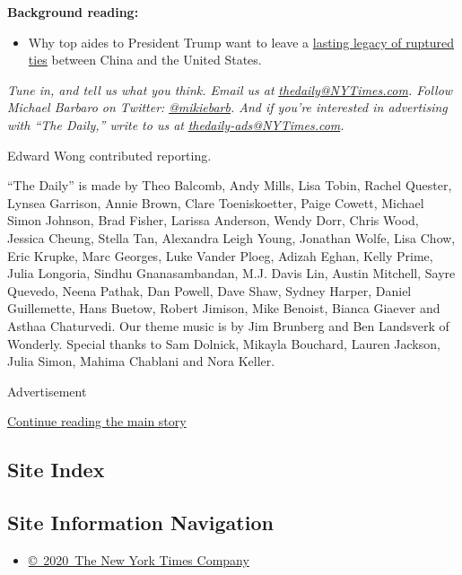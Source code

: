 \textbf{Background reading:}

\begin{itemize}
\tightlist
\item
  Why top aides to President Trump want to leave a
  \href{https://www.nytimes3xbfgragh.onion/2020/07/25/world/asia/us-china-trump-xi.html}{lasting
  legacy of ruptured ties} between China and the United States.
\end{itemize}

\emph{Tune in, and tell us what you think. Email us at}
\href{mailto:thedaily@NYTimes.com}{\emph{thedaily@NYTimes.com}}\emph{.
Follow Michael Barbaro on Twitter:}
\href{https://twitter.com/mikiebarb}{\emph{@mikiebarb}}\emph{. And if
you're interested in advertising with ``The Daily,'' write to us at}
\href{mailto:thedaily-ads@NYTimes.com}{\emph{thedaily-ads@NYTimes.com}}\emph{.}

Edward Wong contributed reporting.

``The Daily'' is made by Theo Balcomb, Andy Mills, Lisa Tobin, Rachel
Quester, Lynsea Garrison, Annie Brown, Clare Toeniskoetter, Paige
Cowett, Michael Simon Johnson, Brad Fisher, Larissa Anderson, Wendy
Dorr, Chris Wood, Jessica Cheung, Stella Tan, Alexandra Leigh Young,
Jonathan Wolfe, Lisa Chow, Eric Krupke, Marc Georges, Luke Vander Ploeg,
Adizah Eghan, Kelly Prime, Julia Longoria, Sindhu Gnanasambandan, M.J.
Davis Lin, Austin Mitchell, Sayre Quevedo, Neena Pathak, Dan Powell,
Dave Shaw, Sydney Harper, Daniel Guillemette, Hans Buetow, Robert
Jimison, Mike Benoist, Bianca Giaever and Asthaa Chaturvedi. Our theme
music is by Jim Brunberg and Ben Landsverk of Wonderly. Special thanks
to Sam Dolnick, Mikayla Bouchard, Lauren Jackson, Julia Simon, Mahima
Chablani and Nora Keller.

Advertisement

\protect\hyperlink{after-bottom}{Continue reading the main story}

\hypertarget{site-index}{%
\subsection{Site Index}\label{site-index}}

\hypertarget{site-information-navigation}{%
\subsection{Site Information
Navigation}\label{site-information-navigation}}

\begin{itemize}
\tightlist
\item
  \href{https://help.nytimes3xbfgragh.onion/hc/en-us/articles/115014792127-Copyright-notice}{©~2020~The
  New York Times Company}
\end{itemize}

